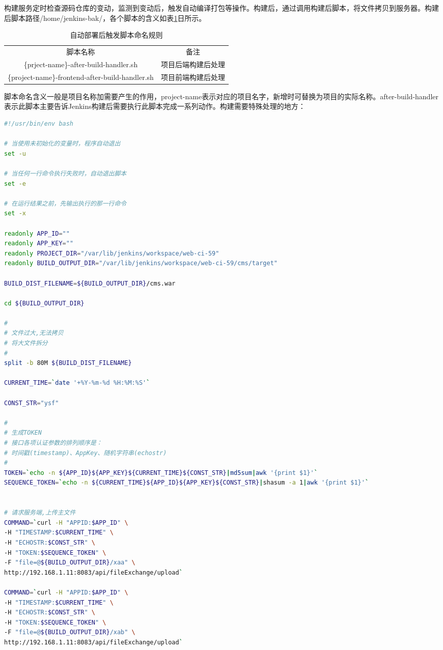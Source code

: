 \documentclass{book}
\begin{document}
构建服务定时检查源码仓库的变动，监测到变动后，触发自动编译打包等操作。构建后，通过调用构建后脚本，将文件拷贝到服务器。构建后脚本路径/home/jenkins-bak/，各个脚本的含义如表\ref{table:handlernamingrule}日所示。

\begin{table}[htbp]
	\caption{自动部署后触发脚本命名规则}
	\label{table:handlernamingrule}
	\begin{center}
		\begin{tabular}{|c|p{5cm}|}
			\hline
			\multirow{1}{*}{脚本名称}		 
			& \multicolumn{1}{c|}{备注}\\			
			\cline{1-2}
			\{prject-name\}-after-build-handler.sh &  项目后端构建后处理 \\
			\hline
			\{project-name\}-frontend-after-build-handler.sh  & 项目前端构建后处理 \\		
			\hline				
		\end{tabular}	
	\end{center}
\end{table}

脚本命名含义一般是项目名称加需要产生的作用，project-name表示对应的项目名字，新增时可替换为项目的实际名称。after-build-handler表示此脚本主要告诉Jenkins构建后需要执行此脚本完成一系列动作。构建需要特殊处理的地方：


\begin{lstlisting}[language=Bash]
#!/usr/bin/env bash

# 当使用未初始化的变量时，程序自动退出
set -u

# 当任何一行命令执行失败时，自动退出脚本
set -e

# 在运行结果之前，先输出执行的那一行命令
set -x

readonly APP_ID=""
readonly APP_KEY=""
readonly PROJECT_DIR="/var/lib/jenkins/workspace/web-ci-59"
readonly BUILD_OUTPUT_DIR="/var/lib/jenkins/workspace/web-ci-59/cms/target"

BUILD_DIST_FILENAME=${BUILD_OUTPUT_DIR}/cms.war

cd ${BUILD_OUTPUT_DIR}

#
# 文件过大,无法拷贝
# 将大文件拆分
#
split -b 80M ${BUILD_DIST_FILENAME}

CURRENT_TIME=`date '+%Y-%m-%d %H:%M:%S'`

CONST_STR="ysf"

#
# 生成TOKEN
# 接口各项认证参数的排列顺序是：
# 时间戳(timestamp)、AppKey、随机字符串(echostr)
#
TOKEN=`echo -n ${APP_ID}${APP_KEY}${CURRENT_TIME}${CONST_STR}|md5sum|awk '{print $1}'`
SEQUENCE_TOKEN=`echo -n ${CURRENT_TIME}${APP_ID}${APP_KEY}${CONST_STR}|shasum -a 1|awk '{print $1}'`


# 请求服务端,上传主文件
COMMAND=`curl -H "APPID:$APP_ID" \
-H "TIMESTAMP:$CURRENT_TIME" \
-H "ECHOSTR:$CONST_STR" \
-H "TOKEN:$SEQUENCE_TOKEN" \
-F "file=@${BUILD_OUTPUT_DIR}/xaa" \
http://192.168.1.11:8083/api/fileExchange/upload`

COMMAND=`curl -H "APPID:$APP_ID" \
-H "TIMESTAMP:$CURRENT_TIME" \
-H "ECHOSTR:$CONST_STR" \
-H "TOKEN:$SEQUENCE_TOKEN" \
-F "file=@${BUILD_OUTPUT_DIR}/xab" \
http://192.168.1.11:8083/api/fileExchange/upload`
\end{lstlisting}
\end{document}
